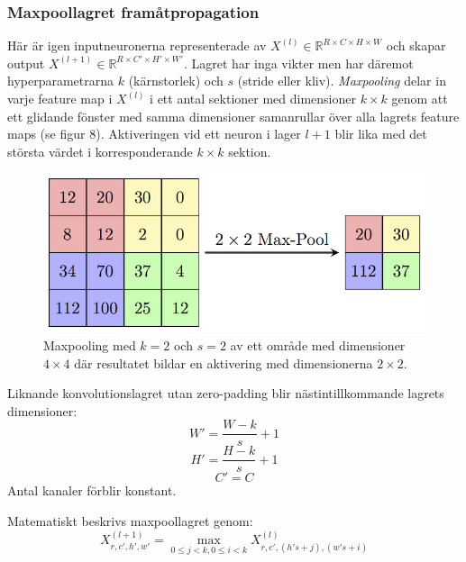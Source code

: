 \documentclass[a4paper,11pt,twoside]{article}
\begin{document}
\subsubsection{Maxpoollagret framåtpropagation}
Här är igen inputneuronerna representerade av $X^{(l)} \in \mathbb{R}^{R \times C \times H \times W}$ och skapar output $X^{(l+1)} \in \mathbb{R}^{R \times C' \times H' \times W'}$. Lagret har inga vikter men har däremot hyperparametrarna $k$ (kärnstorlek) och $s$ (stride eller kliv). \textit{Maxpooling} delar in varje feature map i $X^{(l)}$ i ett antal sektioner med dimensioner $k \times k$ genom att ett glidande fönster med samma dimensioner samanrullar över alla lagrets feature maps (se figur 8). Aktiveringen vid ett neuron i lager $l+1$ blir lika med det största värdet i korresponderande $k \times k$ sektion.

\begin{figure}[h]\label{figmaxpool}
	\centering
  		\includegraphics[scale=1.6]{maxpool.png}
  	\caption{Maxpooling med $k=2$ och $s=2$ av ett område med dimensioner $4 \times 4$ där resultatet bildar en aktivering med dimensionerna $2 \times 2$.}
\end{figure}

Liknande konvolutionslagret utan zero-padding blir nästintillkommande lagrets dimensioner:
\begin{equation}
W' = \frac{W-k}{s}+1
\end{equation}
\begin{equation}
H' = \frac{H-k}{s}+1
\end{equation}
\begin{equation}
C' = C
\end{equation}
Antal kanaler förblir konstant.

Matematiskt beskrivs maxpoollagret genom:
\begin{equation}\label{maxpool}
X^{(l+1)}_{r,c',h',w'} = \underset{0 \leq j < k,0 \leq i < k}{\max} X^{(l)}_{r,c',(h's+j),(w's+i)}
\end{equation}
\end{document}
